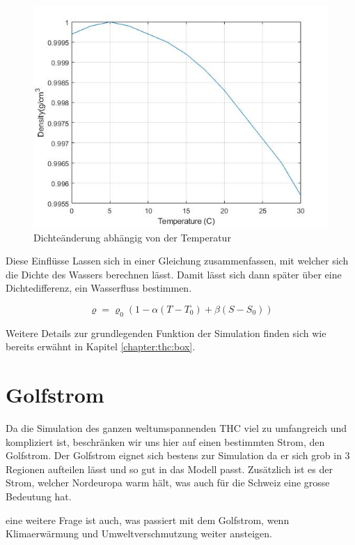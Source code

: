 \begin{figure}
	\centering
	\includegraphics[width=12cm]{thermohalin/Code/graphs/graph_temp.jpg}
	\caption{Dichteänderung abhängig von der Temperatur}
\end{figure}

 Diese Einflüsse Lassen sich in einer Gleichung zusammenfassen, mit welcher sich die Dichte des Wassers berechnen lässt. Damit lässt sich dann später über eine Dichtedifferenz, ein Wasserfluss bestimmen.
 

\begin{equation}
\varrho
=
\varrho_0(1-\alpha(T-T_0)+\beta(S-S_0))
\label{skript:salinity-linear}
\end{equation} 

Weitere Details zur grundlegenden Funktion der Simulation finden sich wie bereits erwähnt in Kapitel \ref{chapter:thc:box}.


\section{Golfstrom}

Da die Simulation des ganzen weltumspannenden THC viel zu umfangreich und kompliziert ist, beschränken wir uns hier auf einen bestimmten Strom, den Golfstrom.
Der Golfstrom eignet sich bestens zur Simulation da er sich grob in 3 Regionen aufteilen lässt und so gut in das Modell passt. Zusätzlich ist es der Strom, welcher Nordeuropa warm hält, was auch für die Schweiz eine grosse Bedeutung hat.

eine weitere Frage ist auch, was passiert mit dem Golfstrom, wenn Klimaerwärmung und Umweltverschmutzung weiter ansteigen.

